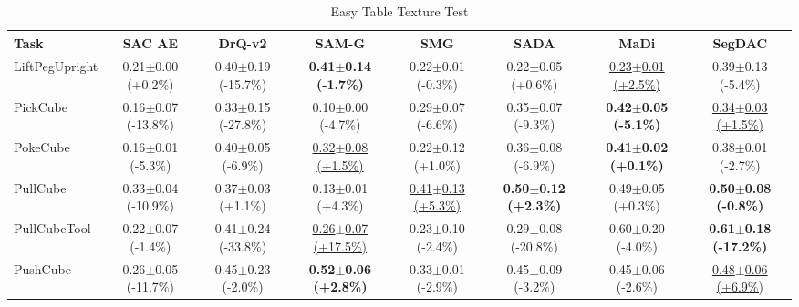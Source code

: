 \begin{table}[htbp]
\centering
\scriptsize
\caption{Easy Table Texture Test}
\label{tab:appendix_tabletexturetest_easy}
\begin{adjustbox}{max width=\textwidth}
\begin{tabular}{l*{7}{c}}
\toprule
\textbf{Task} & \textbf{SAC AE} & \textbf{DrQ-v2} & \textbf{SAM-G} & \textbf{SMG} & \textbf{SADA} & \textbf{MaDi} & \textbf{SegDAC} \\
\midrule
LiftPegUpright & 0.21$\pm$0.00 \scriptsize{(+0.2\%)} & 0.40$\pm$0.19 \scriptsize{(-15.7\%)} & \textbf{0.41$\pm$0.14 \scriptsize{(-1.7\%)}} & 0.22$\pm$0.01 \scriptsize{(-0.3\%)} & 0.22$\pm$0.05 \scriptsize{(+0.6\%)} & \underline{0.23$\pm$0.01 \scriptsize{(+2.5\%)}} & 0.39$\pm$0.13 \scriptsize{(-5.4\%)} \\
PickCube & 0.16$\pm$0.07 \scriptsize{(-13.8\%)} & 0.33$\pm$0.15 \scriptsize{(-27.8\%)} & 0.10$\pm$0.00 \scriptsize{(-4.7\%)} & 0.29$\pm$0.07 \scriptsize{(-6.6\%)} & 0.35$\pm$0.07 \scriptsize{(-9.3\%)} & \textbf{0.42$\pm$0.05 \scriptsize{(-5.1\%)}} & \underline{0.34$\pm$0.03 \scriptsize{(+1.5\%)}} \\
PokeCube & 0.16$\pm$0.01 \scriptsize{(-5.3\%)} & 0.40$\pm$0.05 \scriptsize{(-6.9\%)} & \underline{0.32$\pm$0.08 \scriptsize{(+1.5\%)}} & 0.22$\pm$0.12 \scriptsize{(+1.0\%)} & 0.36$\pm$0.08 \scriptsize{(-6.9\%)} & \textbf{0.41$\pm$0.02 \scriptsize{(+0.1\%)}} & 0.38$\pm$0.01 \scriptsize{(-2.7\%)} \\
PullCube & 0.33$\pm$0.04 \scriptsize{(-10.9\%)} & 0.37$\pm$0.03 \scriptsize{(+1.1\%)} & 0.13$\pm$0.01 \scriptsize{(+4.3\%)} & \underline{0.41$\pm$0.13 \scriptsize{(+5.3\%)}} & \textbf{0.50$\pm$0.12 \scriptsize{(+2.3\%)}} & 0.49$\pm$0.05 \scriptsize{(+0.3\%)} & \textbf{0.50$\pm$0.08 \scriptsize{(-0.8\%)}} \\
PullCubeTool & 0.22$\pm$0.07 \scriptsize{(-1.4\%)} & 0.41$\pm$0.24 \scriptsize{(-33.8\%)} & \underline{0.26$\pm$0.07 \scriptsize{(+17.5\%)}} & 0.23$\pm$0.10 \scriptsize{(-2.4\%)} & 0.29$\pm$0.08 \scriptsize{(-20.8\%)} & 0.60$\pm$0.20 \scriptsize{(-4.0\%)} & \textbf{0.61$\pm$0.18 \scriptsize{(-17.2\%)}} \\
PushCube & 0.26$\pm$0.05 \scriptsize{(-11.7\%)} & 0.45$\pm$0.23 \scriptsize{(-2.0\%)} & \textbf{0.52$\pm$0.06 \scriptsize{(+2.8\%)}} & 0.33$\pm$0.01 \scriptsize{(-2.9\%)} & 0.45$\pm$0.09 \scriptsize{(-3.2\%)} & 0.45$\pm$0.06 \scriptsize{(-2.6\%)} & \underline{0.48$\pm$0.06 \scriptsize{(+6.9\%)}} \\

\end{tabular}
\end{adjustbox}
\end{table}
